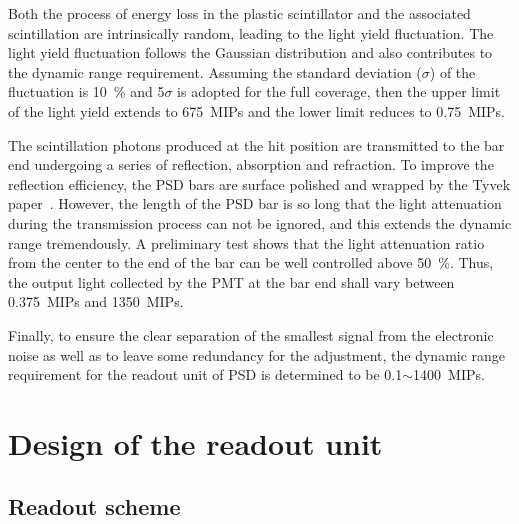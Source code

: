 \documentclass[preprint, times]{elsarticle}
\begin{document}
Both the process of energy loss in the plastic scintillator and the associated scintillation are intrinsically random, leading to the light yield fluctuation.
The light yield fluctuation follows the Gaussian distribution and also contributes to the dynamic range requirement.
Assuming the standard deviation ($\sigma$) of the fluctuation is \SI{10}{\percent} and 5$\sigma$ is adopted for the full coverage, then the upper limit of the light yield extends to \SI{675}{MIPs} and the lower limit reduces to \SI{0.75}{MIPs}.

The scintillation photons produced at the hit position are transmitted to the bar end undergoing a series of reflection, absorption and refraction.
To improve the reflection efficiency, the PSD bars are surface polished and wrapped by the Tyvek paper~\cite{tyvek}. 
However, the length of the PSD bar is so long that the light attenuation during the transmission process can not be ignored, and this extends the dynamic range tremendously.
A preliminary test shows that the light attenuation ratio from the center to the end of the bar can be well controlled above \SI{50}{\percent}. 
Thus, the output light collected by the PMT at the bar end shall vary between \SI{0.375}{MIPs} and \SI{1350}{MIPs}.

Finally, to ensure the clear separation of the smallest signal from the electronic noise as well as to leave some redundancy for the adjustment, the dynamic range requirement for the readout unit of PSD is determined to be \SI{0.1}{}$\sim$\SI{1400}{MIPs}.

\section{Design of the readout unit}
\label{sec:design}

\subsection{Readout scheme}
\label{sec:scheme}
\end{document}
